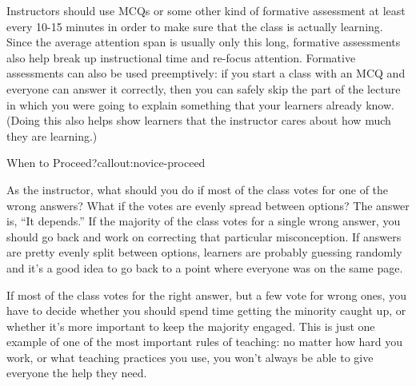 Instructors should use MCQs or some other kind of formative assessment
at least every 10-15 minutes in order to make sure that the class is
actually learning. Since the average attention span is usually only this
long, formative assessments also help break up instructional time and
re-focus attention. Formative assessments can also be used preemptively:
if you start a class with an MCQ and everyone can answer it correctly,
then you can safely skip the part of the lecture in which you were going
to explain something that your learners already know. (Doing this also
helps show learners that the instructor cares about how much they are
learning.)

\begin{callout}{When to Proceed?}{callout:novice-proceed}

As the instructor, what should you do if most of the class votes for
one of the wrong answers? What if the votes are evenly spread between
options?  The answer is, ``It depends.''  If the majority of the class
votes for a single wrong answer, you should go back and work on
correcting that particular misconception. If answers are pretty evenly
split between options, learners are probably guessing randomly and
it's a good idea to go back to a point where everyone was on the same
page.

If most of the class votes for the right answer, but a few vote for
wrong ones, you have to decide whether you should spend time getting
the minority caught up, or whether it's more important to keep the
majority engaged.  This is just one example of one of the most
important rules of teaching: no matter how hard you work, or what
teaching practices you use, you won't always be able to give everyone
the help they need.

\end{callout}

